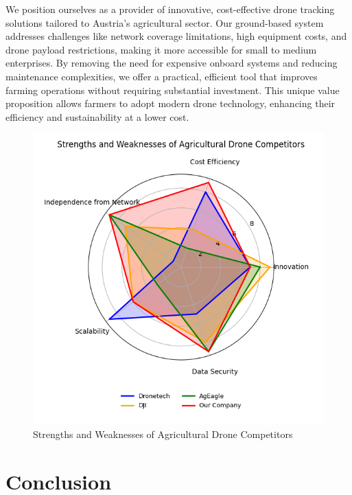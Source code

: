 We position ourselves as a provider of innovative, cost-effective drone tracking solutions tailored to Austria's agricultural sector. Our ground-based system addresses challenges like network coverage limitations, high equipment costs, and drone payload restrictions, making it more accessible for small to medium enterprises. By removing the need for expensive onboard systems and reducing maintenance complexities, we offer a practical, efficient tool that improves farming operations without requiring substantial investment. This unique value proposition allows farmers to adopt modern drone technology, enhancing their efficiency and sustainability at a lower cost.

\begin{figure}
	[H] 
	\centering 
	\hspace*{-1.5cm} 
	\includegraphics[width=400pt]{figures/competitors.png} 
	\caption{Strengths and Weaknesses of Agricultural Drone Competitors}
	\label{fig:strengths_weaknesses} 
\end{figure}

\section{Conclusion}


